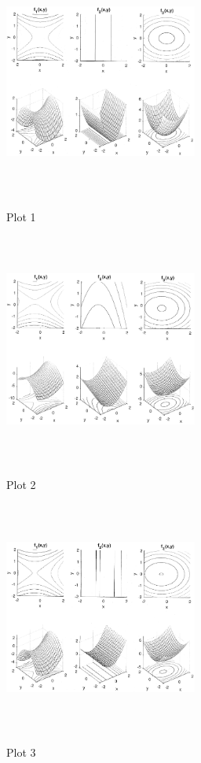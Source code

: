 \begin{marginfigure}
	\centering
	\includegraphics[width=2.5in,height=3in]{figures/ch07/figure1112_01.png}
	\caption{Plot 1} 
\end{marginfigure}


\begin{marginfigure}
	\centering
	\includegraphics[width=2.5in,height=3in]{figures/ch07/figure1112_02.png}
	\caption{Plot 2} 
\end{marginfigure}


\begin{marginfigure}
	\centering
	\includegraphics[width=2.5in,height=3in]{figures/ch07/figure1112_03.png}
	\caption{Plot 3} 
\end{marginfigure}

